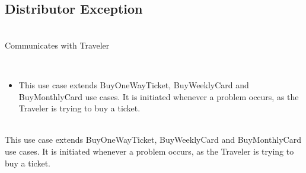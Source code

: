 \subsection{Distributor Exception}


 \\
Communicates with Traveler
\\

 \\
\begin{itemize}

\item This use case extends BuyOneWayTicket, BuyWeeklyCard and BuyMonthlyCard use cases. It is initiated whenever a problem occurs, as the Traveler is trying to buy a ticket.

\end{itemize}

 \\
This use case extends BuyOneWayTicket, BuyWeeklyCard and BuyMonthlyCard use cases. It is initiated whenever a problem occurs, as the Traveler is trying to buy a ticket.
\\
